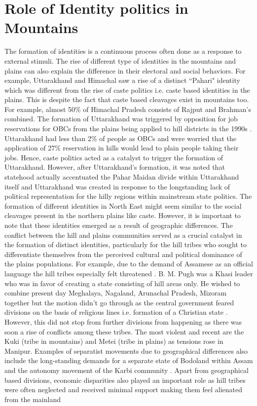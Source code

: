 \section{Role of Identity politics in Mountains}
\begin{sloppypar}
The formation of identities is a continuous process often done as a response to external stimuli. The rise of different type of identities in the mountains and plains can also explain the difference in their electoral and social behaviors. For example, Uttarakhand and Himachal saw a rise of a distinct ``Pahari" identity \citep{mishra2000politics} which was different from the rise of caste politics i.e. caste based identities in the plains. This is despite the fact that caste based cleavages exist in mountains too. For example, almost 50\% of Himachal Pradesh consists of Rajput and Brahman's combined. The formation of Uttarakhand was triggered by opposition for job reservations for OBCs from the plains being applied to hill districts in the 1990s \citep{mishra2000politics}. Uttarakhand had less than 2\% of people as OBCs and were worried that the application of 27\% reservation in hills would lead to plain people taking their jobs. Hence, caste politics acted as a catalyst to trigger the formation of Uttarakhand. However, after Uttarakhand's formation, it was noted that statehood actually accentuated the Pahar Maidan divide within Uttarakhand itself  \citep{mathur2015remote} and Uttarakhand was created in response to the longstanding lack of political representation for the hilly regions within mainstream state politics. The formation of different identities in North East might seem similar to the social cleavages present in the northern plains like caste. However, it is important to note that these identities emerged as a result of geographic differences. The conflict between the hill and plains communities served as a crucial catalyst in the formation of distinct identities, particularly for the hill tribes who sought to differentiate themselves from the perceived cultural and political dominance of the plains populations. For example, due to the demand of Assamese as an official language the hill tribes especially felt threatened \citep{inoue2005integration}.  B. M. Pugh was a Khasi leader who was in favor of creating a state consisting of hill areas only. He wished to combine present day Meghalaya, Nagaland, Arunachal Pradesh, Mizoram together but the motion didn't go through as the central government feared divisions on the basis of religious lines i.e. formation of a Christian state \citep{karlsson2013evading}. However, this did not stop from further divisions from happening as there was soon a rise of  conflicts among these tribes. The most violent and recent are the Kuki (tribe in mountains) and Metei (tribe in plains) as tensions rose in Manipur. Examples of separatist movements due to geographical differences also include the long\hyp{}standing demands for a separate state of Bodoland within Assam  and the autonomy movement of the Karbi community \citep{sarma2017bodoland}. Apart from geographical based divisions, economic disparities also played an important role as hill tribes were often neglected and received minimal support making them feel alienated from the mainland 
\end{sloppypar}
